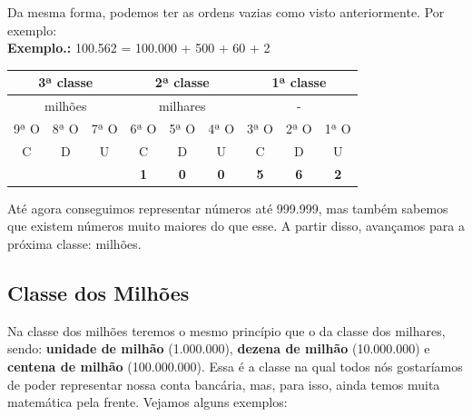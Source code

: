 Da mesma forma, podemos ter as ordens vazias como visto anteriormente. Por exemplo:\\
	
\textbf{Exemplo.:} 100.562 = 100.000 + 500 + 60 + 2

\begin{table}[H]
\begin{tabular}{|ccc|ccc|ccc|}
\hline
\multicolumn{3}{|c|}{3ª classe} & \multicolumn{3}{c|}{2ª classe} & \multicolumn{3}{c|}{1ª classe} \\ \hline
\multicolumn{3}{|c|}{milhões} & \multicolumn{3}{c|}{milhares} & \multicolumn{3}{c|}{-} \\ \hline
\multicolumn{1}{|c|}{9ª O} & \multicolumn{1}{c|}{8ª O} & 7ª O & \multicolumn{1}{c|}{6ª O} & \multicolumn{1}{c|}{5ª O} & 4ª O & \multicolumn{1}{c|}{3ª O} & \multicolumn{1}{c|}{2ª O} & 1ª O \\ \hline
\multicolumn{1}{|c|}{C} & \multicolumn{1}{c|}{D} & U & \multicolumn{1}{c|}{C} & \multicolumn{1}{c|}{D} & U & \multicolumn{1}{c|}{C} & \multicolumn{1}{c|}{D} & U \\ \hline
\rowcolor[HTML]{FFFC9E} 
\multicolumn{1}{|c|}{\cellcolor[HTML]{FFFC9E}\textbf{}} & \multicolumn{1}{c|}{\cellcolor[HTML]{FFFC9E}\textbf{}} & \textbf{} & \multicolumn{1}{c|}{\cellcolor[HTML]{FFFC9E}\textbf{1}} & \multicolumn{1}{c|}{\cellcolor[HTML]{FFFC9E}\textbf{0}} & \textbf{0} & \multicolumn{1}{c|}{\cellcolor[HTML]{FFFC9E}\textbf{5}} & \multicolumn{1}{c|}{\cellcolor[HTML]{FFFC9E}\textbf{6}} & \textbf{2} \\ \hline
\end{tabular}
\end{table}

Até agora conseguimos representar números até 999.999, mas também sabemos que existem números muito maiores do que esse. A partir disso, avançamos para a próxima classe: milhões.

\subsection{Classe dos Milhões}

Na classe dos milhões teremos o mesmo princípio que o da classe dos milhares, sendo: \textbf{unidade de milhão} (1.000.000), \textbf{dezena de milhão} (10.000.000) e \textbf{centena de milhão} (100.000.000). Essa é a classe na qual todos nós gostaríamos de poder representar nossa conta bancária, mas, para isso, ainda temos muita matemática pela frente. Vejamos alguns exemplos:

